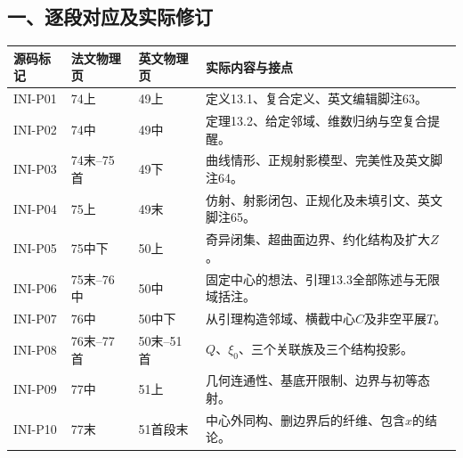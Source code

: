 \documentclass[UTF8,a4paper]{ctexbook}
\begin{document}
\subsection*{一、逐段对应及实际修订}

\begin{longtable}{@{}p{.12\linewidth}p{.17\linewidth}p{.17\linewidth}p{.42\linewidth}@{}}
\toprule
源码标记 & 法文物理页 & 英文物理页 & 实际内容与接点\\
\midrule
\endhead
INI-P01 & 74上 & 49上 & 定义13.1、复合定义、英文编辑脚注63。\\
INI-P02 & 74中 & 49中 & 定理13.2、给定邻域、维数归纳与空复合提醒。\\
INI-P03 & 74末--75首 & 49下 & 曲线情形、正规射影模型、完美性及英文脚注64。\\
INI-P04 & 75上 & 49末 & 仿射、射影闭包、正规化及未填引文、英文脚注65。\\
INI-P05 & 75中下 & 50上 & 奇异闭集、超曲面边界、约化结构及扩大$Z$。\\
INI-P06 & 75末--76中 & 50中 & 固定中心的想法、引理13.3全部陈述与无限域括注。\\
INI-P07 & 76中 & 50中下 & 从引理构造邻域、横截中心$C$及非空平展$T$。\\
INI-P08 & 76末--77首 & 50末--51首 & $Q$、$\xi_0$、三个关联族及三个结构投影。\\
INI-P09 & 77中 & 51上 & 几何连通性、基底开限制、边界与初等态射。\\
INI-P10 & 77末 & 51首段末 & 中心外同构、删边界后的纤维、包含$x$的结论。\\
\bottomrule
\end{longtable}
\end{document}
